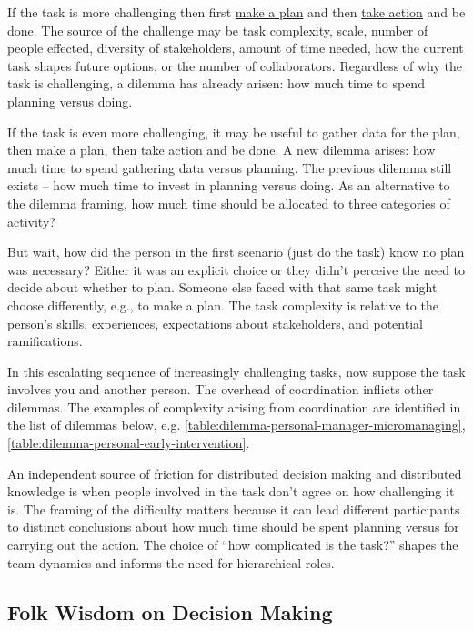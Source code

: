 If the task is more challenging then first \underline{make a plan} and then \underline{take action} and be done. 
The source of the challenge may be task complexity, scale, number of people effected, diversity of stakeholders, amount of time needed, how the current task shapes future options, or the number of collaborators. Regardless of why the task is challenging, a dilemma has already arisen: how much time to spend planning versus doing. 

If the task is even more challenging, it may be useful to gather data for the plan, then make a plan, then take action and be done. A new dilemma arises: how much time to spend gathering data versus planning. The previous dilemma still exists -- how much time to invest in planning versus doing. 
As an alternative to the dilemma framing, how much time should be allocated to three categories of activity?

But wait, how did the person in the first scenario (just do the task) know no plan was necessary? Either it was an explicit choice or they didn't perceive the need to decide about whether to plan. Someone else faced with that same task might choose differently, e.g., to make a plan. The task complexity is relative to the person's skills, experiences, expectations about stakeholders, and potential ramifications.

In this escalating sequence of increasingly challenging tasks, now suppose the task involves you and another person. The overhead of coordination inflicts other dilemmas. The examples of complexity arising from coordination are identified in the list of dilemmas below, e.g. \ref{table:dilemma-personal-manager-micromanaging}, \ref{table:dilemma-personal-early-intervention}.

An independent source of friction for distributed decision making and distributed knowledge is when people involved in the task don't agree on how challenging it is. The framing of the difficulty matters because it can lead different participants to distinct conclusions about how much time should be spent planning versus for carrying out the action. The choice of ``how complicated is the task?'' shapes the team dynamics and informs the need for hierarchical roles. 

\subsection*{Folk Wisdom on Decision Making}

